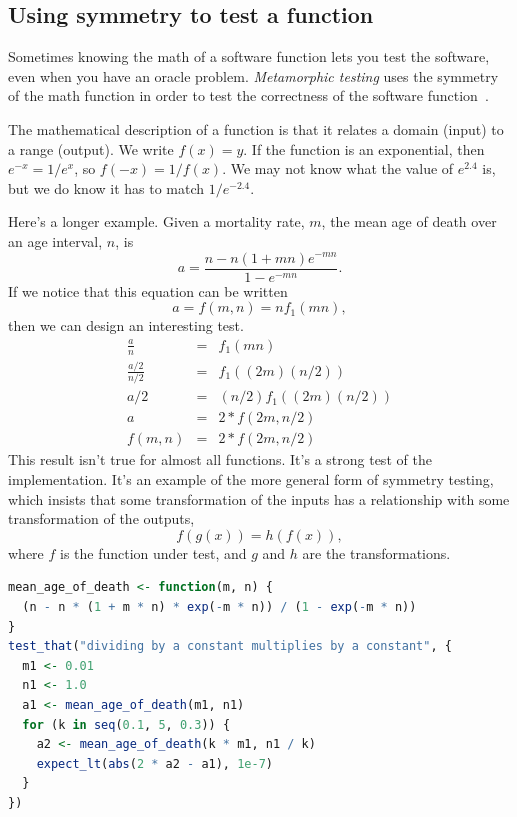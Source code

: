 \documentclass[fleqn,10pt]{olplainarticle}
\begin{document}
\subsection{Using symmetry to test a function}\label{sec:symmetry-test}

Sometimes knowing the math of a software function lets you
test the software, even when you have an oracle problem.
\emph{Metamorphic testing} uses the symmetry of the math function
in order to test the correctness of the software function~\citep{ding2016,guderlei2007,kanewala2015,liu2014}.

The mathematical description of a function is that it relates
a domain (input) to a range (output). We write $f(x) = y$.
If the function is an exponential, then $e^{-x} = 1 / e^x$,
so $f(-x) = 1 / f(x)$. We may not know what the value of
$e^{2.4}$ is, but we do know it has to match $1 / e^{-2.4}$.

Here's a longer example. Given a mortality rate, $m$, the
mean age of death over an age interval, $n$, is
\begin{equation}
    a = \frac{n - n(1+m n)e^{-m n}}{1 - e^{-m n}}.
\end{equation}
If we notice that this equation can be written
\begin{equation}
    a = f(m, n) = n  f_1(m  n),
\end{equation}
then we can design an interesting test.
\begin{eqnarray}
    \frac{a}{n} &= &f_1(m  n) \\
    \frac{a/2}{n/2} &= & f_1((2  m)  (n / 2)) \\
    a /2 &= & (n/2) f_1((2  m)  (n / 2)) \\
    a &= &2 * f(2m, n/2) \\
    f(m, n) & =& 2 * f(2m, n/2)
\end{eqnarray}
This result isn't true for almost all functions. It's a strong test
of the implementation. It's an example of the more general
form of symmetry testing, which insists that some transformation
of the inputs has a relationship with some transformation of the 
outputs,
\begin{equation}
    f(g(x)) = h(f(x)),
\end{equation}
where $f$ is the function under test, and $g$ and $h$ are the transformations.

\begin{lstlisting}[language=R]
mean_age_of_death <- function(m, n) {
  (n - n * (1 + m * n) * exp(-m * n)) / (1 - exp(-m * n))
}
test_that("dividing by a constant multiplies by a constant", {
  m1 <- 0.01
  n1 <- 1.0
  a1 <- mean_age_of_death(m1, n1)
  for (k in seq(0.1, 5, 0.3)) {
    a2 <- mean_age_of_death(k * m1, n1 / k)
    expect_lt(abs(2 * a2 - a1), 1e-7)
  }
})
\end{lstlisting}
\end{document}
